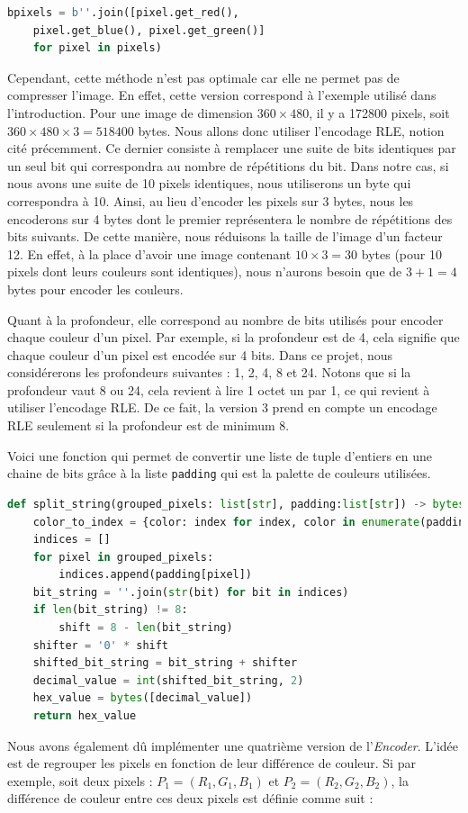 \documentclass[utf8]{article}
\begin{document}
\begin{lstlisting}[language=Python, basicstyle=\small]
bpixels = b''.join([pixel.get_red(), 
	pixel.get_blue(), pixel.get_green()] 
	for pixel in pixels)
\end{lstlisting}

Cependant, cette méthode n'est pas optimale car elle ne permet pas de compresser l'image. En effet, cette version correspond à l'exemple utilisé dans l'introduction. Pour une image de dimension $360 \times 480$, il y a 172800 pixels, soit $360 \times 480 \times 3 = 518400$ bytes. Nous allons donc utiliser l'encodage RLE, notion cité précemment. Ce dernier consiste à remplacer une suite de bits identiques par un seul bit qui correspondra au nombre de répétitions du bit. Dans notre cas, si nous avons une suite de 10 pixels identiques, nous utiliserons un byte qui correspondra à 10. Ainsi, au lieu d'encoder les pixels sur 3 bytes, nous les encoderons sur 4 bytes dont le premier représentera le nombre de répétitions des bits suivants. De cette manière, nous réduisons la taille de l'image d'un facteur 12. En effet, à la place d'avoir une image contenant $10 \times 3 = 30$ bytes (pour 10 pixels dont leurs couleurs sont identiques), nous n'aurons besoin que de $3+1 = 4$ bytes pour encoder les couleurs.

Quant à la profondeur, elle correspond au nombre de bits utilisés pour encoder chaque couleur d'un pixel. Par exemple, si la profondeur est de 4, cela signifie que chaque couleur d'un pixel est encodée sur 4 bits. Dans ce projet, nous considérerons les profondeurs suivantes : 1, 2, 4, 8 et 24. Notons que si la profondeur vaut 8 ou 24, cela revient à lire 1 octet un par 1, ce qui revient à utiliser l'encodage RLE. De ce fait, la version 3 prend en compte un encodage RLE seulement si la profondeur est de minimum 8.  

Voici une fonction qui permet de convertir une liste de tuple d'entiers en une chaine de bits grâce à la liste \texttt{padding} qui est la palette de couleurs utilisées.
\begin{lstlisting}[language=Python, basicstyle=\small]
def split_string(grouped_pixels: list[str], padding:list[str]) -> bytes:
	color_to_index = {color: index for index, color in enumerate(padding)}
	indices = []
	for pixel in grouped_pixels:   	
		indices.append(padding[pixel])
	bit_string = ''.join(str(bit) for bit in indices)
	if len(bit_string) != 8:  
		shift = 8 - len(bit_string)
	shifter = '0' * shift
	shifted_bit_string = bit_string + shifter
	decimal_value = int(shifted_bit_string, 2)
	hex_value = bytes([decimal_value])
	return hex_value
\end{lstlisting}
Nous avons également dû implémenter une quatrième  version de l'\textit{Encoder}. L'idée est de regrouper les pixels en fonction de leur différence de couleur. Si par exemple, soit deux pixels : $P_1 = (R_1, G_1, B_1)$ et $P_2 = (R_2, G_2, B_2)$, la différence de couleur entre ces deux pixels est définie comme suit : 
\end{document}
